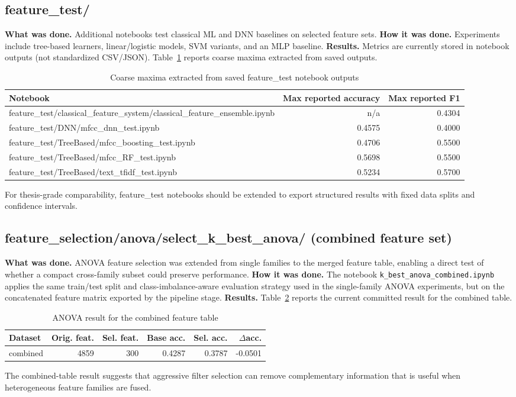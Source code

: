 \subsection{feature\_test/}
\textbf{What was done.} Additional notebooks test classical ML and DNN baselines on selected feature sets.
\textbf{How it was done.} Experiments include tree-based learners, linear/logistic models, SVM variants, and an MLP baseline.
\textbf{Results.} Metrics are currently stored in notebook outputs (not standardized CSV/JSON). Table~\ref{tab:feature_test_outputs} reports coarse maxima extracted from saved outputs.
\begin{table}[h]
\centering
\caption{Coarse maxima extracted from saved feature\_test notebook outputs}
\label{tab:feature_test_outputs}
\begin{tabular}{lrr}
\hline
Notebook & Max reported accuracy & Max reported F1 \\
\hline
feature\_test/classical\_feature\_system/classical\_feature\_ensemble.ipynb & n/a & 0.4304 \\
feature\_test/DNN/mfcc\_dnn\_test.ipynb & 0.4575 & 0.4000 \\
feature\_test/TreeBased/mfcc\_boosting\_test.ipynb & 0.4706 & 0.5500 \\
feature\_test/TreeBased/mfcc\_RF\_test.ipynb & 0.5698 & 0.5500 \\
feature\_test/TreeBased/text\_tfidf\_test.ipynb & 0.5234 & 0.5700 \\
\hline
\end{tabular}
\end{table}
\noindent For thesis-grade comparability, feature\_test notebooks should be extended to export structured results with fixed data splits and confidence intervals.
\subsection{feature\_selection/anova/select\_k\_best\_anova/ (combined feature set)}
\textbf{What was done.} ANOVA feature selection was extended from single families to the merged feature table, enabling a direct test of whether a compact cross-family subset could preserve performance.
\textbf{How it was done.} The notebook \texttt{k\_best\_anova\_combined.ipynb} applies the same train/test split and class-imbalance-aware evaluation strategy used in the single-family ANOVA experiments, but on the concatenated feature matrix exported by the pipeline stage.
\textbf{Results.} Table~\ref{tab:anova_combined_results} reports the current committed result for the combined table.
\begin{table}[h]
\centering
\caption{ANOVA result for the combined feature table}
\label{tab:anova_combined_results}
\begin{tabular}{lrrrrr}
\hline
Dataset & Orig. feat. & Sel. feat. & Base acc. & Sel. acc. & $\Delta$acc. \\
\hline
combined & 4859 & 300 & 0.4287 & 0.3787 & -0.0501 \\
\hline
\end{tabular}
\end{table}
\noindent The combined-table result suggests that aggressive filter selection can remove complementary information that is useful when heterogeneous feature families are fused.
